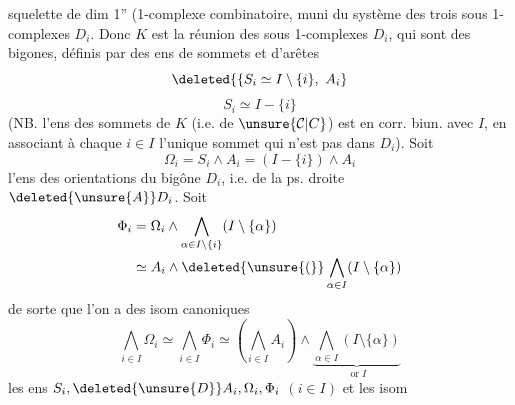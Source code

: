 squelette de dim 1'' (1-complexe combinatoire, muni du système des trois  sous 1-complexes $D_i$.  Donc $K$ est la réunion des sous\deleted{\unsure{-}} 1-complexes $D_i$, qui sont des bigones,  définis par des ens  de sommets  et d'arêtes    
\[
 \deleted{\{S_i\simeq I\setminus\{i\},\ A_i}
\]
\[
 S_i\simeq I-\{i\}
\]
(NB.  l'ens des sommets de $K$ (i.e. de $\unsure{\mathcal C|C}$) est en corr. biun. avec $I$, en associant à chaque $i\in I$ l'unique sommet qui n'est pas dans $D_i$). Soit
\[
 \Omega_i=S_i\wedge A_i=(I-\{i\})\wedge A_i
\]
l'ens des orientations du bigône $D_i$, i.e. de la ps. droite $\deleted{\unsure{A}}D_i$. Soit
\[
\begin{aligned}
 \Phi_i&=\Omega_i\wedge\bigwedge_{\alpha\in I\setminus\{i\}}(I\setminus\{\alpha\})\\
 &\simeq A_i\wedge\deleted{\unsure{(}}\bigwedge_{\alpha\in I}(I\setminus\{\alpha\})
\end{aligned}
\]
de sorte que l'on a des isom canoniques
\[
 \bigwedge_{i\in I}\Omega_i\simeq\bigwedge_{i\in I}\Phi_i
 \simeq\left(\bigwedge_{i\in I}A_i\right)\wedge
 \underbrace{\bigwedge_{\alpha\in I}(I\setminus\{\alpha\})}_{\operatorname{or} I}\tag*{(15)}
\]
les ens $S_i,\deleted{\unsure{D}}A_i,\Omega_i,\Phi_i$ $(i\in I)$ et les isom
